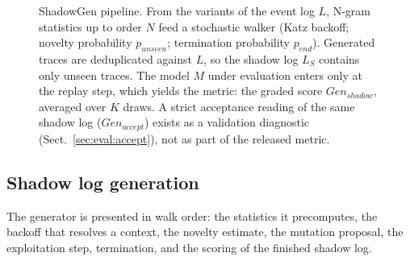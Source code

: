 \documentclass[runningheads]{llncs}
\newcommand{\genshadow}{\ensuremath{\mathit{Gen}_{\mathit{shadow}}}}
\newcommand{\genaccept}{\ensuremath{\mathit{Gen}_{\mathit{accept}}}}
\newcommand{\punseen}{\ensuremath{p_{\mathit{unseen}}}}
\newcommand{\pend}{\ensuremath{p_{\mathit{end}}}}
\newcommand{\shlog}{\ensuremath{L_S}}
\begin{document}
\begin{figure}[t]
\centering
{}
\caption{ShadowGen pipeline. From the variants of the event log $L$, N-gram statistics up to order $N$ feed a stochastic walker (Katz backoff; novelty probability $\punseen$; termination probability $\pend$). Generated traces are deduplicated against $L$, so the shadow log $\shlog$ contains only unseen traces. The model $M$ under evaluation enters only at the replay step, which yields the metric: the graded score \genshadow{}, averaged over $K$ draws. A strict acceptance reading of the same shadow log (\genaccept) exists as a validation diagnostic (Sect.~\ref{sec:eval:accept}), not as part of the released metric.}
\label{fig:pipeline}
\end{figure}

\subsection{Shadow log generation}
\label{sec:method:gen}
The generator is presented in walk order: the statistics it precomputes, the backoff that resolves a context, the novelty estimate, the mutation proposal, the exploitation step, termination, and the scoring of the finished shadow log.
\end{document}
